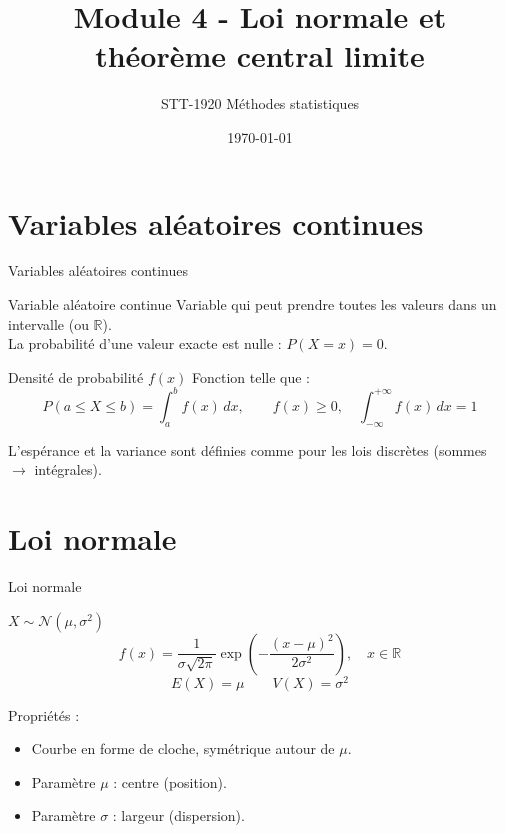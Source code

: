 \documentclass{BeamerTemplate}
\title{Module 4 - Loi normale et théorème central limite}
\subtitle{STT-1920 Méthodes statistiques}
\date{\today}
\begin{document}
\begin{frame}[t]
  \titlepage
\end{frame}

\section{Variables aléatoires continues}

\begin{frame}[t]{Variables aléatoires continues}

\begin{Boite}{Variable aléatoire continue}
Variable qui peut prendre toutes les valeurs dans un intervalle (ou $\mathbb{R}$).\\
La probabilité d'une valeur exacte est \alert{nulle} : $P(X = x) = 0$.
\end{Boite}

\medskip
\begin{Boite}{Densité de probabilité $f(x)$}
Fonction telle que :
$$P(a \le X \le b) = \int_a^b f(x)\,dx, \qquad f(x) \ge 0, \quad \int_{-\infty}^{+\infty} f(x)\,dx = 1$$
\end{Boite}

\medskip
L'espérance et la variance sont définies comme pour les lois discrètes (sommes $\to$ intégrales).

\end{frame}

\section{Loi normale}

\begin{frame}[t]{Loi normale}

\begin{Boite}{$X \sim \mathcal{N}(\mu, \sigma^2)$}
$$f(x) = \frac{1}{\sigma\sqrt{2\pi}}\exp\!\left(-\frac{(x-\mu)^2}{2\sigma^2}\right), \quad x \in \mathbb{R}$$
$$E(X) = \mu \qquad V(X) = \sigma^2$$
\end{Boite}

\medskip
Propriétés :
\begin{itemize}\itemsep3mm
  \item Courbe en forme de \alert{cloche}, symétrique autour de $\mu$.
  \item Paramètre $\mu$ : centre (position).
  \item Paramètre $\sigma$ : largeur (dispersion).
\end{itemize}

\end{frame}
\end{document}
